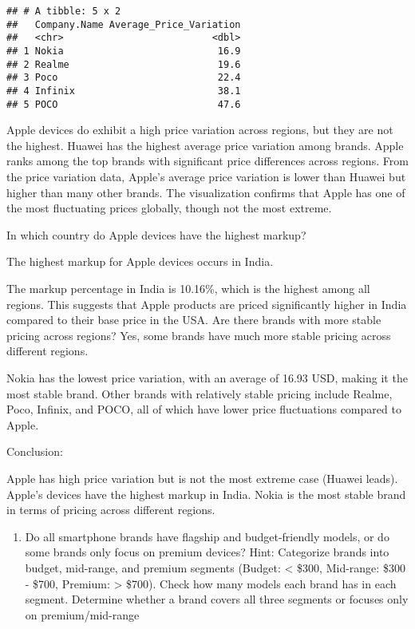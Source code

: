 \documentclass[
]{article}
\providecommand{\tightlist}{%
  \setlength{\itemsep}{0pt}\setlength{\parskip}{0pt}}
\begin{document}
\begin{verbatim}
## # A tibble: 5 x 2
##   Company.Name Average_Price_Variation
##   <chr>                          <dbl>
## 1 Nokia                           16.9
## 2 Realme                          19.6
## 3 Poco                            22.4
## 4 Infinix                         38.1
## 5 POCO                            47.6
\end{verbatim}

Apple devices do exhibit a high price variation across regions, but they
are not the highest. Huawei has the highest average price variation
among brands. Apple ranks among the top brands with significant price
differences across regions. From the price variation data, Apple's
average price variation is lower than Huawei but higher than many other
brands. The visualization confirms that Apple has one of the most
fluctuating prices globally, though not the most extreme.

In which country do Apple devices have the highest markup?

The highest markup for Apple devices occurs in India.

The markup percentage in India is 10.16\%, which is the highest among
all regions. This suggests that Apple products are priced significantly
higher in India compared to their base price in the USA. Are there
brands with more stable pricing across regions? Yes, some brands have
much more stable pricing across different regions.

Nokia has the lowest price variation, with an average of 16.93 USD,
making it the most stable brand. Other brands with relatively stable
pricing include Realme, Poco, Infinix, and POCO, all of which have lower
price fluctuations compared to Apple.

Conclusion:

Apple has high price variation but is not the most extreme case (Huawei
leads). Apple's devices have the highest markup in India. Nokia is the
most stable brand in terms of pricing across different regions.

\begin{enumerate}
\def\labelenumi{\arabic{enumi}.}
\setcounter{enumi}{3}
\tightlist
\item
  Do all smartphone brands have flagship and budget-friendly models, or
  do some brands only focus on premium devices? Hint: Categorize brands
  into budget, mid-range, and premium segments (Budget: \textless{}
  \$300, Mid-range: \$300 - \$700, Premium: \textgreater{} \$700). Check
  how many models each brand has in each segment. Determine whether a
  brand covers all three segments or focuses only on premium/mid-range
\end{enumerate}
\end{document}

